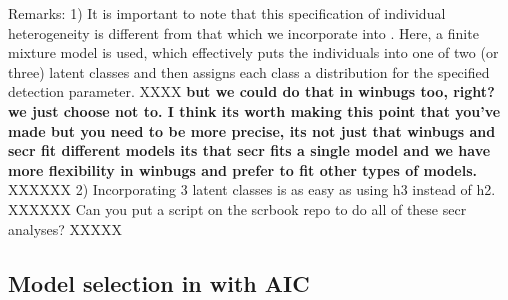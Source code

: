 Remarks:  1) It is important to note that this specification of
individual heterogeneity is different from that which we incorporate
into \winbugs.  Here, a finite mixture model is used, which effectively
puts the individuals into one of two (or three) latent classes and
then assigns each class a distribution for the specified detection
parameter. XXXX 
{\bf but we could do that in winbugs too, right? we just
choose not to. I think its worth making this point that you've made
but you need to be more precise, its not just that winbugs and secr
fit different models its that secr fits a single model and we have
more flexibility in winbugs and prefer to fit other types of models.}
XXXXXX
  2) Incorporating 3 latent classes is as easy as using h3
instead of h2.  XXXXXX Can you put a script on the scrbook repo to do
all of these secr analyses? XXXXX
\begin{comment}
XXXXX if we have exercises in the book we'll put these at the end.
 For homework, the reader should incorporate
heterogeneity in sigma and using 2 and 3 classes.   Take note of any
warning messages or errors.
\end{comment}



\subsection{Model selection in \secr with AIC}

